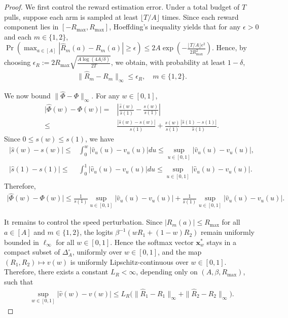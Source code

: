 \documentclass[10pt,a4paper]{amsart}
\newcommand{\Farc}{\Phi}
\newcommand{\bx}{\mathbf{x}}
\newcommand{\hatFarc}{\hat{\Phi}}
\begin{document}
\begin{proof}
We first control the reward estimation error.
Under a total budget of $T$ pulls, suppose each arm is sampled at least
$\lfloor T/A\rfloor$ times. Since each reward component lies in
$[-R_{\max},R_{\max}]$, Hoeffding's inequality yields that for any $\epsilon>0$ and
each $m\in\{1,2\}$,
$
\Pr \left(
\max_{a\in[A]} |\hat R_m(a)-R_m(a)| \ge \epsilon
\right)
\le
2A \exp \left(
-\frac{\lfloor T/A\rfloor \epsilon^2}{2R_{\max}^2}
\right).
$
Hence, by choosing $\epsilon_R
:=
2R_{\max}\sqrt{\frac{A\log(4A/\delta)}{2T}}$,
we obtain, with probability at least $1-\delta$,
\begin{align}
\|\hat R_m-R_m\|_\infty \le \epsilon_R,
\quad m\in\{1,2\}.
\label{eq:bandit_R_uniform_bound}
\end{align}

We now bound $\|\hatFarc-\Farc\|_\infty$. For any $w\in[0,1]$,
\begin{align*}
\big|\hatFarc(w)-\Farc(w)\big|
= & 
\left|\frac{\hat s(w)}{\hat s(1)}-\frac{s(w)}{s(1)}\right| \\
\leq &
\frac{|\hat s(w)-s(w)|}{s(1)}
+
\frac{s(w)}{s(1)}\frac{| \hat s(1)-s(1) |}{\hat s(1)}.
\end{align*}
Since $0\le s(w)\le s(1)$, we have
\begin{align*}
|\hat s(w)-s(w)|
\leq &
\int_0^w |\hat v_u(u)-v_u(u)| du
\le
\sup_{u\in[0,1]} |\hat v_u(u)-v_u(u)|,
\\
|\hat s(1)-s(1)|
\leq &
\int_0^1 |\hat v_u(u)-v_u(u)| du
\le
\sup_{u\in[0,1]} |\hat v_u(u)-v_u(u)|.
\end{align*}
Therefore,
\begin{align}
\big|\hatFarc(w)-\Farc(w)\big|
\le
\frac{1}{s(1)}\sup_{u\in[0,1]} |\hat v_u(u)-v_u(u)|
+
\frac{1}{\hat s(1)}\sup_{u\in[0,1]} |\hat v_u(u)-v_u(u)|.
\label{eq:Farc_diff_pre_event}
\end{align}

It remains to control the speed perturbation.
Since $|R_m(a)|\le R_{\max}$ for all $a\in[A]$ and $m\in\{1,2\}$,
the logits $\beta^{-1}(wR_1+(1-w)R_2)$ remain uniformly bounded in $\ell_\infty$
for all $w\in[0,1]$. Hence the softmax vector $\bx_w^*$ stays in a compact subset
of $\Delta_A^\circ$, uniformly over $w\in[0,1]$, and the map
$(R_1,R_2)\mapsto v(w)$ is uniformly Lipschitz-continuous over $w\in[0,1]$.
Therefore, there exists a constant $L_R<\infty$, depending only on
$(A,\beta,R_{\max})$, such that
\begin{align}
\sup_{w\in[0,1]} |\hat v(w)-v(w)|
\le
L_R\big(\|\hat R_1-R_1\|_\infty+\|\hat R_2-R_2\|_\infty\big).
\label{eq:bandit_speed_lipschitz}
\end{align}


\end{proof}
\end{document}
